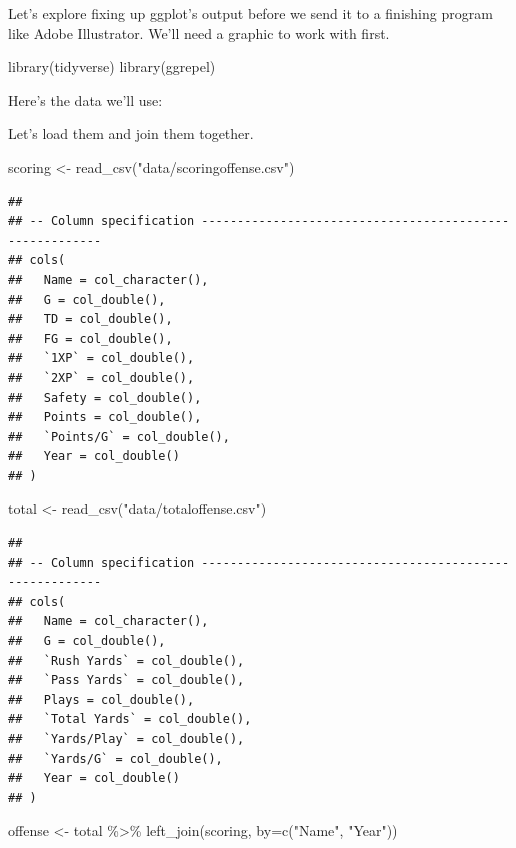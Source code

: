 \documentclass[
]{book}
\newenvironment{Shaded}{\begin{snugshade}}{\end{snugshade}}
\newcommand{\AttributeTok}[1]{\textcolor[rgb]{0.77,0.63,0.00}{#1}}
\newcommand{\FunctionTok}[1]{\textcolor[rgb]{0.00,0.00,0.00}{#1}}
\newcommand{\NormalTok}[1]{#1}
\newcommand{\OtherTok}[1]{\textcolor[rgb]{0.56,0.35,0.01}{#1}}
\newcommand{\SpecialCharTok}[1]{\textcolor[rgb]{0.00,0.00,0.00}{#1}}
\newcommand{\StringTok}[1]{\textcolor[rgb]{0.31,0.60,0.02}{#1}}
\begin{document}
Let's explore fixing up ggplot's output before we send it to a finishing program like Adobe Illustrator. We'll need a graphic to work with first.

\begin{Shaded}
\begin{Highlighting}[]
\FunctionTok{library}\NormalTok{(tidyverse)}
\FunctionTok{library}\NormalTok{(ggrepel)}
\end{Highlighting}
\end{Shaded}

Here's the data we'll use:

Let's load them and join them together.

\begin{Shaded}
\begin{Highlighting}[]
\NormalTok{scoring }\OtherTok{\textless{}{-}} \FunctionTok{read\_csv}\NormalTok{(}\StringTok{"data/scoringoffense.csv"}\NormalTok{)}
\end{Highlighting}
\end{Shaded}

\begin{verbatim}
## 
## -- Column specification --------------------------------------------------------
## cols(
##   Name = col_character(),
##   G = col_double(),
##   TD = col_double(),
##   FG = col_double(),
##   `1XP` = col_double(),
##   `2XP` = col_double(),
##   Safety = col_double(),
##   Points = col_double(),
##   `Points/G` = col_double(),
##   Year = col_double()
## )
\end{verbatim}

\begin{Shaded}
\begin{Highlighting}[]
\NormalTok{total }\OtherTok{\textless{}{-}} \FunctionTok{read\_csv}\NormalTok{(}\StringTok{"data/totaloffense.csv"}\NormalTok{)}
\end{Highlighting}
\end{Shaded}

\begin{verbatim}
## 
## -- Column specification --------------------------------------------------------
## cols(
##   Name = col_character(),
##   G = col_double(),
##   `Rush Yards` = col_double(),
##   `Pass Yards` = col_double(),
##   Plays = col_double(),
##   `Total Yards` = col_double(),
##   `Yards/Play` = col_double(),
##   `Yards/G` = col_double(),
##   Year = col_double()
## )
\end{verbatim}

\begin{Shaded}
\begin{Highlighting}[]
\NormalTok{offense }\OtherTok{\textless{}{-}}\NormalTok{ total }\SpecialCharTok{\%\textgreater{}\%} \FunctionTok{left\_join}\NormalTok{(scoring, }\AttributeTok{by=}\FunctionTok{c}\NormalTok{(}\StringTok{"Name"}\NormalTok{, }\StringTok{"Year"}\NormalTok{))}
\end{Highlighting}
\end{Shaded}
\end{document}
